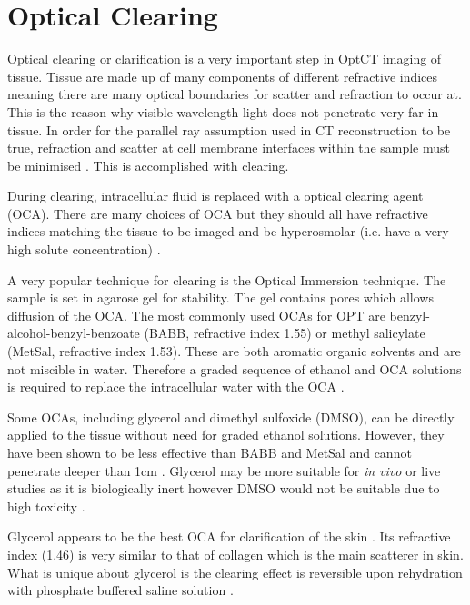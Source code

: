 \documentclass[12pt]{article}
\begin{document}
\newpage
\section{Optical Clearing}
\label{sec:clearing}

Optical clearing or clarification is a very important step in OptCT imaging of tissue. Tissue are made up of many components of different refractive indices meaning there are many optical boundaries for scatter and refraction to occur at. This is the reason why visible wavelength light does not penetrate very far in tissue. In order for the parallel ray assumption used in CT reconstruction to be true, refraction and scatter at cell membrane interfaces within the sample must be minimised \cite{Oldham:2006}.  This is accomplished with clearing.

During clearing, intracellular  fluid is replaced with a optical clearing agent (OCA). There are many choices of OCA but they should all have refractive indices matching the tissue to be imaged and be hyperosmolar (i.e. have a very high solute concentration) \cite{tuchin2007tissue}.
 
 
A very popular technique for clearing is the Optical Immersion technique. The sample is set in agarose gel for stability. The gel contains pores which allows diffusion of the OCA. The most commonly used OCAs for OPT are benzyl-alcohol-benzyl-benzoate (BABB, refractive index 1.55) or methyl salicylate (MetSal, refractive index 1.53). These are both aromatic organic solvents and are not miscible in water. Therefore a graded sequence of ethanol and OCA solutions is required to replace the intracellular water with the OCA \cite{Oldham:2006}. 

Some OCAs, including glycerol and dimethyl sulfoxide (DMSO), can be directly applied to the tissue without need for graded ethanol solutions. However, they have been shown to be less effective than BABB and MetSal and cannot penetrate deeper than 1cm \cite{Oldham:2006}.  Glycerol may be more suitable for \textit{in vivo} or live studies as it is biologically inert however DMSO would not be suitable due to high toxicity \cite{Wen:2009is}.


Glycerol appears to be the best OCA for clarification of the skin \cite{Vargas:1999, Wen:2009is}. Its refractive index (1.46) is very similar to that of collagen which is the main scatterer in skin. What is unique about glycerol is the clearing effect is reversible upon rehydration with phosphate buffered saline solution \cite{Vargas:1999}. 
\end{document}
